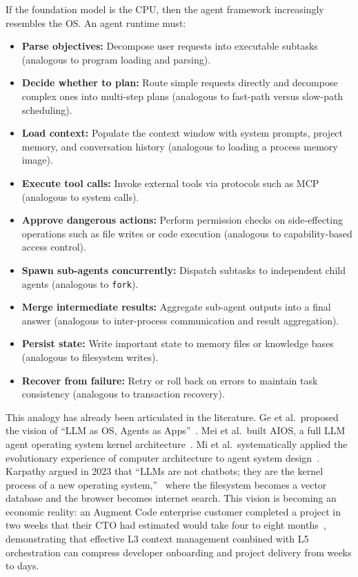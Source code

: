 If the foundation model is the CPU, then the agent framework increasingly resembles the OS.
An agent runtime must:
\begin{itemize}[nosep]
\item \textbf{Parse objectives:} Decompose user requests into executable subtasks (analogous to program loading and parsing).
\item \textbf{Decide whether to plan:} Route simple requests directly and decompose complex ones into multi-step plans (analogous to fast-path versus slow-path scheduling).
\item \textbf{Load context:} Populate the context window with system prompts, project memory, and conversation history (analogous to loading a process memory image).
\item \textbf{Execute tool calls:} Invoke external tools via protocols such as MCP (analogous to system calls).
\item \textbf{Approve dangerous actions:} Perform permission checks on side-effecting operations such as file writes or code execution (analogous to capability-based access control).
\item \textbf{Spawn sub-agents concurrently:} Dispatch subtasks to independent child agents (analogous to \texttt{fork}).
\item \textbf{Merge intermediate results:} Aggregate sub-agent outputs into a final answer (analogous to inter-process communication and result aggregation).
\item \textbf{Persist state:} Write important state to memory files or knowledge bases (analogous to filesystem writes).
\item \textbf{Recover from failure:} Retry or roll back on errors to maintain task consistency (analogous to transaction recovery).
\end{itemize}

This analogy has already been articulated in the literature.
Ge et al.\ proposed the vision of ``LLM as OS, Agents as Apps''~\cite{ge2023llmos}.
Mei et al.\ built AIOS, a full LLM agent operating system kernel architecture~\cite{mei2024aios}.
Mi et al.\ systematically applied the evolutionary experience of computer architecture to agent system design~\cite{mi2025llmagentscomputersystems}.
Karpathy argued in 2023 that ``LLMs are not chatbots; they are the kernel process of a new operating system,''~\cite{karpathy2023lmos} where the filesystem becomes a vector database and the browser becomes internet search.
This vision is becoming an economic reality: an Augment Code enterprise customer completed a project in two weeks that their CTO had estimated would take four to eight months~\cite{anthropic2026agenticreport}, demonstrating that effective L3 context management combined with L5 orchestration can compress developer onboarding and project delivery from weeks to days.

